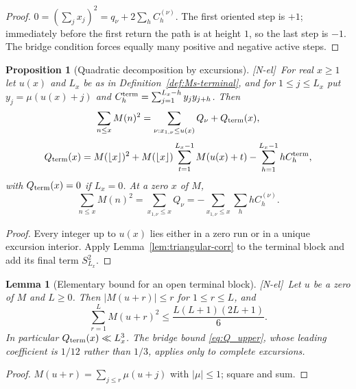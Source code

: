 \documentclass[11pt]{amsart}
\numberwithin{equation}{section}
\theoremstyle{plain}
\newtheorem{proposition}[theorem]{Proposition}
\newtheorem{lemma}[theorem]{Lemma}
\theoremstyle{definition}
\theoremstyle{remark}
\newcommand{\tagNE}{\textup{[N-el]}}
\begin{document}
\begin{proof}
$0=(\sum_jx_j)^2=q_\nu+2\sum_hC_h^{(\nu)}$. The first oriented step is $+1$;
immediately before the first return the path is at height $1$, so the last
step is $-1$. The bridge condition forces equally many positive and negative
active steps.
\end{proof}

\begin{proposition}[Quadratic decomposition by excursions]
\label{prop:quadratic-decomp}
\tagNE\ For real $x\ge1$ let $u(x)$ and $L_x$ be as in
Definition~\ref{def:Ms-terminal}, and for $1\le j\le L_x$ put
$y_j=\mu(u(x)+j)$ and $C_h^{\rm term}=\sum_{j=1}^{L_x-h}y_jy_{j+h}$. Then
\begin{equation}
\label{eq:quadratic-decomp-general}
\sum_{n\le x}M(n)^2
=\sum_{\nu:x_{1,\nu}\le u(x)}Q_\nu+Q_{\rm term}(x),
\end{equation}
\begin{equation}
\label{eq:terminal-Q-exact}
Q_{\rm term}(x)=M(\lfloor x\rfloor)^2
+M(\lfloor x\rfloor)\sum_{t=1}^{L_x-1}M(u(x)+t)
-\sum_{h=1}^{L_x-1}hC_h^{\rm term},
\end{equation}
with $Q_{\rm term}(x)=0$ if $L_x=0$. At a zero $x$ of $M$,
\begin{equation}
\label{eq:quadratic-decomp-zero}
\sum_{n\le x}M(n)^2
=\sum_{x_{1,\nu}\le x}Q_\nu
=-\sum_{x_{1,\nu}\le x}\sum_hhC_h^{(\nu)}.
\end{equation}
\end{proposition}

\begin{proof}
Every integer up to $u(x)$ lies either in a zero run or in a unique excursion
interior. Apply Lemma~\ref{lem:triangular-corr} to the terminal block and
add its final term $S_{L_x}^2$.
\end{proof}

\begin{lemma}[Elementary bound for an open terminal block]
\label{lem:terminal-Q-elementary}
\tagNE\ Let $u$ be a zero of $M$ and $L\ge0$. Then $|M(u+r)|\le r$ for
$1\le r\le L$, and
\begin{equation}
\label{eq:terminal-Q-elementary}
\sum_{r=1}^{L}M(u+r)^2\le\frac{L(L+1)(2L+1)}6 .
\end{equation}
In particular $Q_{\rm term}(x)\ll L_x^3$. The bridge bound
\eqref{eq:Q_upper}, whose leading coefficient is $1/12$ rather than $1/3$,
applies only to complete excursions.
\end{lemma}

\begin{proof}
$M(u+r)=\sum_{j\le r}\mu(u+j)$ with $|\mu|\le1$; square and sum.
\end{proof}
\end{document}
